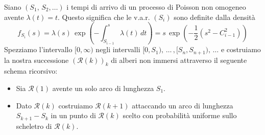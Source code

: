 \documentclass[11pt, twoside]{report}
\newcommand{\Rr}{\mathscr{R}}
\theoremstyle{definition}
\theoremstyle{plain}
\theoremstyle{remark}
\numberwithin{equation}{chapter}
\begin{document}
Siano $(S_1, \, S_2, \dots)$ i tempi di arrivo di un processo di Poisson non omogeneo avente $\lambda(t)=t$. Questo significa che le v.a.r. $(S_i)$ sono definite dalla densità
$$f_{S_i}(s)= \lambda(s) \, \exp\left(-\int_{S_{i-1}}^s \lambda(t) \, dt\right)=s\, \exp\left(-\frac{1}{2} \left(s^2-C_{i-1}^2\right)\right)$$
Spezziamo l'intervallo $[0,\infty)$ negli intervalli $[0,S_1), \, \dots \, ,[S_n, S_{n+1}),\, \dots$ e costruiamo la nostra successione $(\Rr(k))_k$ di alberi non immersi attraverso il seguente schema ricorsivo:
\begin{itemize}
\item Sia $\Rr(1)$ avente un solo arco di lunghezza $S_1$.

\item Dato $\Rr(k)$ costruiamo $\Rr(k+1)$ attaccando un arco di lunghezza $S_{k+1}-S_k$ in un punto di $\Rr(k)$ scelto con probabilità uniforme sullo scheletro di $\Rr(k)$.

\end{itemize} 
\end{document}
